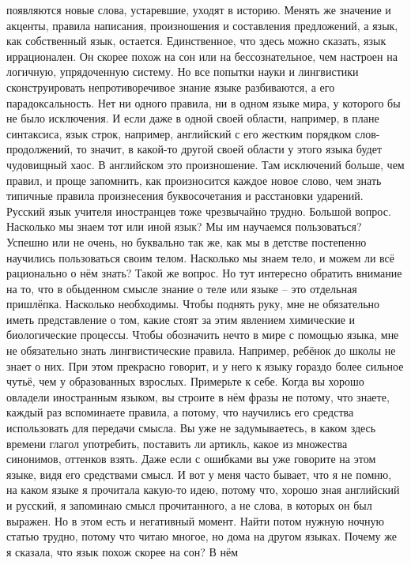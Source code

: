 появляются новые слова, устаревшие, уходят в историю. Менять же значение и
акценты, правила написания, произношения и составления предложений, а язык, как
собственный язык, остается. Единственное, что здесь можно сказать, язык
иррационален. Он скорее похож на сон или на бессознательное, чем настроен на
логичную, упрядоченную систему. Но все попытки науки и лингвистики
сконструировать непротиворечивое знание языке разбиваются, а его
парадоксальность. Нет ни одного правила, ни в одном языке мира, у которого бы не
было исключения. И если даже в одной своей области, например, в плане
синтаксиса, язык строк, например, английский с его жестким порядком слов-
продолжений, то значит, в какой-то другой своей области у этого языка будет
чудовищный хаос. В английском это произношение. Там исключений больше, чем
правил, и проще запомнить, как произносится каждое новое слово, чем знать
типичные правила произнесения буквосочетания и расстановки ударений. Русский
язык учителя иностранцев тоже чрезвычайно трудно. Большой вопрос. Насколько мы
знаем тот или иной язык? Мы им научаемся пользоваться? Успешно или не очень, но
буквально так же, как мы в детстве постепенно научились пользоваться своим
телом. Насколько мы знаем тело, и можем ли всё рационально о нём знать? Такой же
вопрос. Но тут интересно обратить внимание на то, что в обыденном смысле знание
о теле или языке – это отдельная пришлёпка. Насколько необходимы. Чтобы поднять
руку, мне не обязательно иметь представление о том, какие стоят за этим явлением
химические и биологические процессы. Чтобы обозначить нечто в мире с помощью
языка, мне не обязательно знать лингвистические правила. Например, ребёнок до
школы не знает о них. При этом прекрасно говорит, и у него к языку гораздо более
сильное чутьё, чем у образованных взрослых. Примерьте к себе. Когда вы хорошо
овладели иностранным языком, вы строите в нём фразы не потому, что знаете,
каждый раз вспоминаете правила, а потому, что научились его средства
использовать для передачи смысла. Вы уже не задумываетесь, в каком здесь времени
глагол употребить, поставить ли артикль, какое из множества синонимов, оттенков
взять. Даже если с ошибками вы уже говорите на этом языке, видя его средствами
смысл. И вот у меня часто бывает, что я не помню, на каком языке я прочитала
какую-то идею, потому что, хорошо зная английский и русский, я запоминаю смысл
прочитанного, а не слова, в которых он был выражен. Но в этом есть и негативный
момент. Найти потом нужную ночную статью трудно, потому что читаю многое, но
дома на другом языках. Почему же я сказала, что язык похож скорее на сон? В нём
